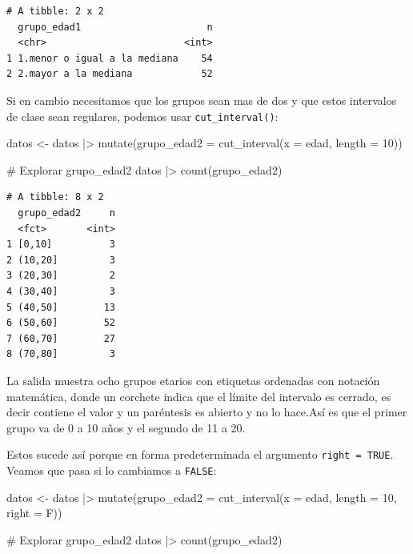 \documentclass[
  spanish,
  a4paper,
]{scrbook}
\newenvironment{Shaded}{\begin{snugshade}}{\end{snugshade}}
\newcommand{\AttributeTok}[1]{\textcolor[rgb]{0.40,0.45,0.13}{#1}}
\newcommand{\CommentTok}[1]{\textcolor[rgb]{0.37,0.37,0.37}{#1}}
\newcommand{\DecValTok}[1]{\textcolor[rgb]{0.68,0.00,0.00}{#1}}
\newcommand{\FunctionTok}[1]{\textcolor[rgb]{0.28,0.35,0.67}{#1}}
\newcommand{\NormalTok}[1]{\textcolor[rgb]{0.00,0.23,0.31}{#1}}
\newcommand{\OtherTok}[1]{\textcolor[rgb]{0.00,0.23,0.31}{#1}}
\newcommand{\SpecialCharTok}[1]{\textcolor[rgb]{0.37,0.37,0.37}{#1}}
\begin{document}
\begin{verbatim}
# A tibble: 2 x 2
  grupo_edad1                      n
  <chr>                        <int>
1 1.menor o igual a la mediana    54
2 2.mayor a la mediana            52
\end{verbatim}

Si en cambio necesitamos que los grupos sean mas de dos y que estos
intervalos de clase sean regulares, podemos usar
\texttt{cut\_interval()}:

\begin{Shaded}
\begin{Highlighting}[]
\NormalTok{datos }\OtherTok{\textless{}{-}}\NormalTok{ datos }\SpecialCharTok{|\textgreater{}}
  \FunctionTok{mutate}\NormalTok{(}\AttributeTok{grupo\_edad2 =} \FunctionTok{cut\_interval}\NormalTok{(}\AttributeTok{x =}\NormalTok{ edad, }\AttributeTok{length =} \DecValTok{10}\NormalTok{))}

\CommentTok{\# Explorar grupo\_edad2}
\NormalTok{datos }\SpecialCharTok{|\textgreater{}}
  \FunctionTok{count}\NormalTok{(grupo\_edad2)}
\end{Highlighting}
\end{Shaded}

\begin{verbatim}
# A tibble: 8 x 2
  grupo_edad2     n
  <fct>       <int>
1 [0,10]          3
2 (10,20]         3
3 (20,30]         2
4 (30,40]         3
5 (40,50]        13
6 (50,60]        52
7 (60,70]        27
8 (70,80]         3
\end{verbatim}

La salida muestra ocho grupos etarios con etiquetas ordenadas con
notación matemática, donde un corchete indica que el límite del
intervalo es cerrado, es decir contiene el valor y un paréntesis es
abierto y no lo hace.Así es que el primer grupo va de 0 a 10 años y el
segundo de 11 a 20.

Estos sucede así porque en forma predeterminada el argumento
\texttt{right\ =\ TRUE}. Veamos que pasa si lo cambiamos a
\texttt{FALSE}:

\begin{Shaded}
\begin{Highlighting}[]
\NormalTok{datos }\OtherTok{\textless{}{-}}\NormalTok{ datos }\SpecialCharTok{|\textgreater{}}
  \FunctionTok{mutate}\NormalTok{(}\AttributeTok{grupo\_edad2 =} \FunctionTok{cut\_interval}\NormalTok{(}\AttributeTok{x =}\NormalTok{ edad, }\AttributeTok{length =} \DecValTok{10}\NormalTok{, }\AttributeTok{right =}\NormalTok{ F))}

\CommentTok{\# Explorar grupo\_edad2}
\NormalTok{datos }\SpecialCharTok{|\textgreater{}}
  \FunctionTok{count}\NormalTok{(grupo\_edad2)}
\end{Highlighting}
\end{Shaded}
\end{document}

